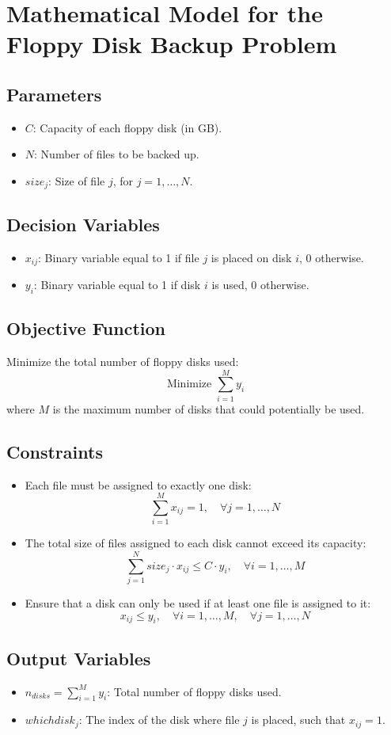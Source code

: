 \documentclass{article}
\begin{document}
\section*{Mathematical Model for the Floppy Disk Backup Problem}

\subsection*{Parameters}
\begin{itemize}
    \item $C$: Capacity of each floppy disk (in GB).
    \item $N$: Number of files to be backed up.
    \item $size_j$: Size of file $j$, for $j = 1, \ldots, N$.
\end{itemize}

\subsection*{Decision Variables}
\begin{itemize}
    \item $x_{ij}$: Binary variable equal to 1 if file $j$ is placed on disk $i$, 0 otherwise.
    \item $y_i$: Binary variable equal to 1 if disk $i$ is used, 0 otherwise.
\end{itemize}

\subsection*{Objective Function}
Minimize the total number of floppy disks used:
\[
\text{Minimize } \sum_{i=1}^{M} y_i
\]
where $M$ is the maximum number of disks that could potentially be used.

\subsection*{Constraints}
\begin{itemize}
    \item Each file must be assigned to exactly one disk:
    \[
    \sum_{i=1}^{M} x_{ij} = 1, \quad \forall j = 1, \ldots, N
    \]

    \item The total size of files assigned to each disk cannot exceed its capacity:
    \[
    \sum_{j=1}^{N} size_j \cdot x_{ij} \leq C \cdot y_i, \quad \forall i = 1, \ldots, M
    \]
    
    \item Ensure that a disk can only be used if at least one file is assigned to it:
    \[
    x_{ij} \leq y_i, \quad \forall i = 1, \ldots, M, \quad \forall j = 1, \ldots, N
    \]
\end{itemize}

\subsection*{Output Variables}
\begin{itemize}
    \item $n_{disks} = \sum_{i=1}^{M} y_i$: Total number of floppy disks used.
    \item $whichdisk_j$: The index of the disk where file $j$ is placed, such that $x_{ij} = 1$.
\end{itemize}
\end{document}
